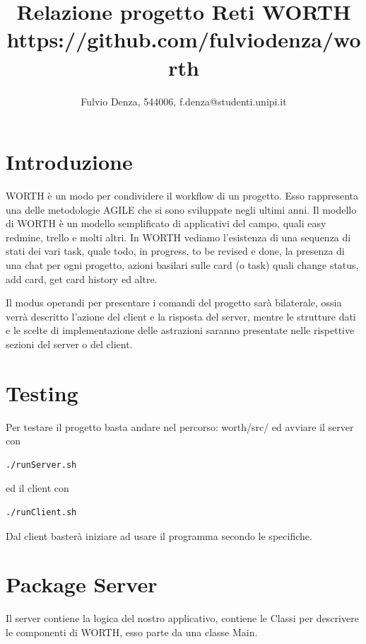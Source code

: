 \documentclass[]{article}
\title{Relazione progetto Reti WORTH
\large https://github.com/fulviodenza/worth}
\author{Fulvio Denza, 544006, f.denza@studenti.unipi.it}
\begin{document}
\maketitle

\section{Introduzione}
WORTH è un modo per condividere il workflow di un progetto. Esso rappresenta una delle metodologie AGILE che si sono sviluppate negli ultimi anni. Il modello di WORTH è un modello semplificato di applicativi del campo, quali easy redmine, trello e molti altri. In WORTH vediamo l'esistenza di una sequenza di stati dei vari task, quale todo, in progress, to be revised e done, la presenza di una chat per ogni progetto, azioni basilari sulle card (o task) quali change status, add card, get card history ed altre.

Il modus operandi per presentare i comandi del progetto sarà bilaterale, ossia verrà descritto l'azione del client e la risposta del server, mentre le strutture dati e le scelte di implementazione delle astrazioni saranno presentate nelle rispettive sezioni del server o del client.
\section{Testing}
Per testare il progetto basta andare nel percorso:
worth/src/ ed avviare il server con
\begin{lstlisting}[language=bash]
	./runServer.sh
\end{lstlisting}
ed il client con
\begin{lstlisting}[language=bash]
	./runClient.sh
\end{lstlisting}
Dal client basterà iniziare ad usare il programma secondo le specifiche.
\section{Package Server}
Il server contiene la logica del nostro applicativo, contiene le Classi per descrivere le componenti di WORTH, esso parte da una classe Main.
\end{document}
